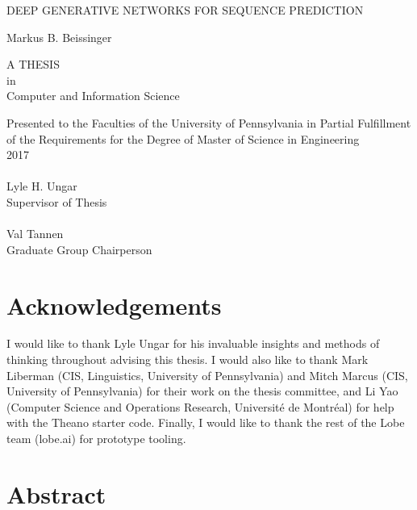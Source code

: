 \documentclass[12pt, titlepage]{report}
\begin{document}
	\doublespacing
	
	\begin{titlepage}
		\begin{center}
			{\singlespacing \LARGE \uppercase{Deep Generative Networks for Sequence Prediction}\\[24pt]}
			
			{\Large Markus B. Beissinger\\[12pt]}
			
			\uppercase{a thesis}\\[12pt]					
			in\\			
			{\Large Computer and Information Science\\[36pt]}
			
			Presented to the Faculties of the University of Pennsylvania in Partial Fulfillment of the Requirements for the Degree of Master of Science in Engineering\\[12pt]
			
			2017\\[60pt]
			
			\singlespacing
			\makebox[2.5in]{\hrulefill}\\
			Lyle H. Ungar\\
			Supervisor of Thesis\\[48pt]
			
			\makebox[2.5in]{\hrulefill}\\
			Val Tannen\\
			Graduate Group Chairperson
			
			\doublespacing
		\end{center}
	\end{titlepage}
	

	\chapter*{Acknowledgements}
	I would like to thank Lyle Ungar for his invaluable insights and methods of thinking throughout advising this thesis. I would also like to thank Mark Liberman (CIS, Linguistics, University of Pennsylvania) and Mitch Marcus (CIS, University of Pennsylvania) for their work on the thesis committee, and Li Yao (Computer Science and Operations Research, Universit\'{e} de Montr\'{e}al) for help with the Theano starter code. Finally, I would like to thank the rest of the Lobe team (lobe.ai) for prototype tooling.
	
	\chapter*{Abstract}
	
	
\end{document}
